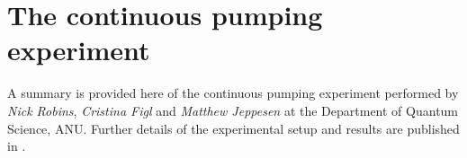 % 
% 
% 
% 


\section{The continuous pumping experiment}
\label{OpticalPumping:ContinuousExperiment}

A summary is provided here of the continuous pumping experiment performed by \emph{Nick Robins}, \emph{Cristina Figl} and \emph{Matthew Jeppesen} at the Department of Quantum Science, ANU.  Further details of the experimental setup and results are published in \citet{Robins:2008}.

